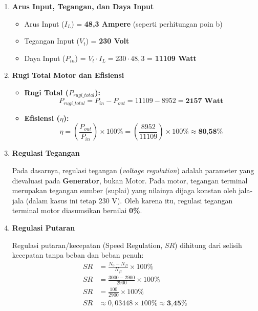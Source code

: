 \documentclass[12pt, a4paper]{article}
\begin{document}
\begin{enumerate}[label=\alph*.]
    \item \textbf{Arus Input, Tegangan, dan Daya Input}

    \begin{itemize}
        \item Arus Input ($I_L$) = \textbf{48,3 Ampere} (seperti perhitungan poin b)
        \item Tegangan Input ($V_t$) = \textbf{230 Volt}
        \item Daya Input ($P_{in}$) = $V_t \cdot I_L = 230 \cdot 48,3$ = \textbf{11109 Watt}
    \end{itemize}

    \item \textbf{Rugi Total Motor dan Efisiensi}

    \begin{itemize}
        \item \textbf{Rugi Total ($P_{rugi\_total}$):}
        \[
            P_{rugi\_total} = P_{in} - P_{out} = 11109 - 8952 = \textbf{2157 Watt}
        \]
        \item \textbf{Efisiensi ($\eta$):}
        \[
            \eta = \left( \frac{P_{out}}{P_{in}} \right) \times 100\% = \left( \frac{8952}{11109} \right) \times 100\% \approx \textbf{80,58\%}
        \]
    \end{itemize}

    \item \textbf{Regulasi Tegangan}

    Pada dasarnya, regulasi tegangan (\textit{voltage regulation}) adalah parameter yang dievaluasi pada \textbf{Generator}, bukan Motor. Pada motor, tegangan terminal merupakan tegangan sumber (suplai) yang nilainya dijaga konstan oleh jala-jala (dalam kasus ini tetap 230 V). Oleh karena itu, regulasi tegangan terminal motor diasumsikan bernilai \textbf{0\%}.

    \item \textbf{Regulasi Putaran}

    Regulasi putaran/kecepatan (Speed Regulation, $SR$) dihitung dari selisih kecepatan tanpa beban dan beban penuh:
    \begin{align*}
        SR &= \frac{N_0 - N_{fl}}{N_{fl}} \times 100\% \\
        SR &= \frac{3000 - 2900}{2900} \times 100\% \\
        SR &= \frac{100}{2900} \times 100\% \\
        SR &\approx 0,03448 \times 100\% \approx \textbf{3,45\%}
    \end{align*}
\end{enumerate}
\end{document}
